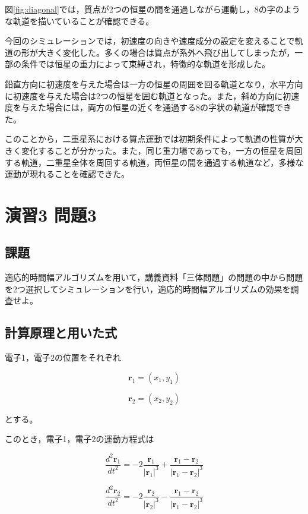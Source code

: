 \documentclass[uplatex,dvipdfmx]{jsarticle}
\begin{document}
図\ref{fig:diagonal}では，質点が2つの恒星の間を通過しながら運動し，8の字のような軌道を描いていることが確認できる。

今回のシミュレーションでは，初速度の向きや速度成分の設定を変えることで軌道の形が大きく変化した。多くの場合は質点が系外へ飛び出してしまったが，一部の条件では恒星の重力によって束縛され，特徴的な軌道を形成した。

鉛直方向に初速度を与えた場合は一方の恒星の周囲を回る軌道となり，水平方向に初速度を与えた場合は2つの恒星を囲む軌道となった。また，斜め方向に初速度を与えた場合には，両方の恒星の近くを通過する8の字状の軌道が確認できた。

このことから，二重星系における質点運動では初期条件によって軌道の性質が大きく変化することが分かった。また，同じ重力場であっても，一方の恒星を周回する軌道，二重星全体を周回する軌道，両恒星の間を通過する軌道など，多様な運動が現れることを確認できた。

\section{演習3 問題3}

\subsection{課題}

適応的時間幅アルゴリズムを用いて，講義資料「三体問題」の問題の中から問題を2つ選択してシミュレーションを行い，適応的時間幅アルゴリズムの効果を調査せよ。

\subsection{計算原理と用いた式}

電子1，電子2の位置をそれぞれ

\[
\bm{r}_1=(x_1,y_1)
\]

\[
\bm{r}_2=(x_2,y_2)
\]

とする。

このとき，電子1，電子2の運動方程式は

\begin{equation}
\frac{d^2\bm{r}_1}{dt^2}
=
-2\frac{\bm{r}_1}{|\bm{r}_1|^3}
+
\frac{\bm{r}_1-\bm{r}_2}{|\bm{r}_1-\bm{r}_2|^3}
\end{equation}

\begin{equation}
\frac{d^2\bm{r}_2}{dt^2}
=
-2\frac{\bm{r}_2}{|\bm{r}_2|^3}
-
\frac{\bm{r}_1-\bm{r}_2}{|\bm{r}_1-\bm{r}_2|^3}
\end{equation}
\end{document}
